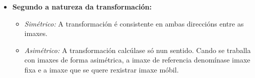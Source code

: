 \begin{itemize}
    \item \textbf{Segundo a natureza da transformación:}
    \begin{itemize}
        \item \textit{Simétrico:} A transformación é consistente en ambas direccións entre as imaxes.
        \item \textit{Asimétrico:} A transformación calcúlase só nun sentido. Cando se traballa con imaxes de forma asimétrica, a imaxe de referencia denomínase imaxe fixa e a imaxe que se quere rexistrar imaxe móbil.
    \end{itemize}

\end{itemize}

        
            
